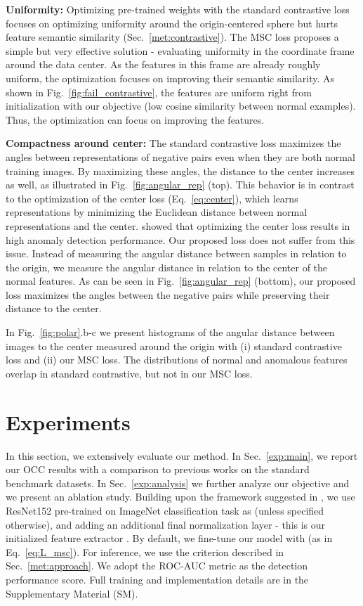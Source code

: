 \documentclass[letterpaper]{article} \usepackage{aaai23}  \usepackage{times}  \usepackage{helvet}  \usepackage{courier}  \usepackage[hyphens]{url}  \usepackage{graphicx} \usepackage{amsmath, amssymb}
\begin{document}
\textbf{Uniformity:} Optimizing pre-trained weights with the standard contrastive loss focuses on optimizing uniformity around the origin-centered sphere but hurts feature semantic similarity (Sec.~\ref{met:contrastive}). The MSC loss proposes a simple but very effective solution - evaluating uniformity in the coordinate frame around the data center. As the features in this frame are already roughly uniform, the optimization focuses on improving their semantic similarity. As shown in Fig.~\ref{fig:fail_contrastive}, the features are uniform right from initialization with our objective (low cosine similarity between normal examples). Thus, the optimization can focus on improving the features.

\textbf{Compactness around center:} The standard contrastive loss maximizes the angles between representations of negative pairs even when they are both normal training images. By maximizing these angles, the distance to the center increases as well, as illustrated in Fig.~\ref{fig:angular_rep} (top). This behavior is in contrast to the optimization of the center loss (Eq.~\ref{eq:center}), which learns representations by minimizing the Euclidean distance between normal representations and the center. \cite{reiss2021panda} showed that optimizing the center loss results in high anomaly detection performance. Our proposed loss does not suffer from this issue. Instead of measuring the angular distance between samples in relation to the origin, we measure the angular distance in relation to the center of the normal features. As can be seen in Fig.~\ref{fig:angular_rep} (bottom), our proposed loss maximizes the angles between the negative pairs while preserving their distance to the center.

In Fig.~\ref{fig:polar}.b-c we present histograms of the angular distance between images to the center measured around the origin with (i) standard contrastive loss and (ii) our MSC loss. The distributions of normal and anomalous features overlap in standard contrastive, but not in our MSC loss.

\section{Experiments}
\label{sec:exp}

In this section, we extensively evaluate our method. In Sec.~\ref{exp:main}, we report our OCC results with a comparison to previous works on the standard benchmark datasets. In Sec.~\ref{exp:analysis} we further analyze our objective and we present an ablation study. Building upon the framework suggested in \cite{reiss2021panda}, we use ResNet152 pre-trained on ImageNet classification task as  (unless specified otherwise), and adding an additional final  normalization layer - this is our initialized feature extractor .  By default, we fine-tune our model with  (as in Eq.~\ref{eq:L_msc}). For inference, we use the criterion described in Sec.~\ref{met:approach}. We adopt the ROC-AUC metric as the detection performance score. Full training and implementation details are in the Supplementary Material (SM).
\end{document}
